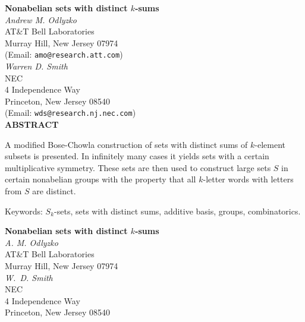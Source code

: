 \begin{center}
{\Large {\bf Nonabelian sets with distinct $k$-sums}} \\
\vspace{\baselineskip}
{\em Andrew M. Odlyzko} \\
\vspace{0.5\baselineskip}
AT\&T Bell Laboratories \\
Murray Hill, New Jersey 07974 \\
(Email: {\tt amo@research.att.com}) \\
\vspace{\baselineskip}
{\em Warren D. Smith} \\
\vspace{0.5\baselineskip}
NEC \\
4 Independence Way \\
Princeton, New Jersey 08540 \\
(Email: {\tt wds@research.nj.nec.com}) \\
\vspace{1.5\baselineskip}
{\bf ABSTRACT}
\vspace{.5\baselineskip}
\end{center}
\setlength{\baselineskip}{1.5\baselineskip}
\hspace*{.25in}
A modified Bose-Chowla construction of sets with distinct sums of $k$-element
subsets is presented. 
In infinitely many cases it yields sets with a certain
multiplicative symmetry.
These sets are then used to construct large sets $S$ in
certain nonabelian groups with the property
that all $k$-letter words with letters from $S$ are distinct.

\vspace{.5in}
\begin{list}
{}{\setlength{\leftmargin}{.8in}\setlength{\labelwidth}{0.8in}
\setlength{\labelsep}{.1in}\hfill}
\item[{Keywords:}]
$S_k$-sets, sets with distinct sums, additive basis,
groups, combinatorics.
\end{list}
\clearpage
\large\normalsize
\newcommand{\af}{\alpha}
\renewcommand{\baselinestretch}{1}
\thispagestyle{empty}
\setcounter{page}{1}
\begin{center}
{\Large {\bf Nonabelian sets with distinct $k$-sums}} \\
\vspace{\baselineskip}
{\em A. M. Odlyzko} \\
\vspace{0.5\baselineskip}
AT\&T Bell Laboratories \\
Murray Hill, New Jersey 07974 \\
\vspace{\baselineskip}
{\em W.~D. Smith} \\
\vspace{0.5\baselineskip}
NEC \\
4 Independence Way \\
Princeton, New Jersey 08540 \\
\vspace{1.5\baselineskip}
\end{center}
\setlength{\baselineskip}{1.5\baselineskip}
